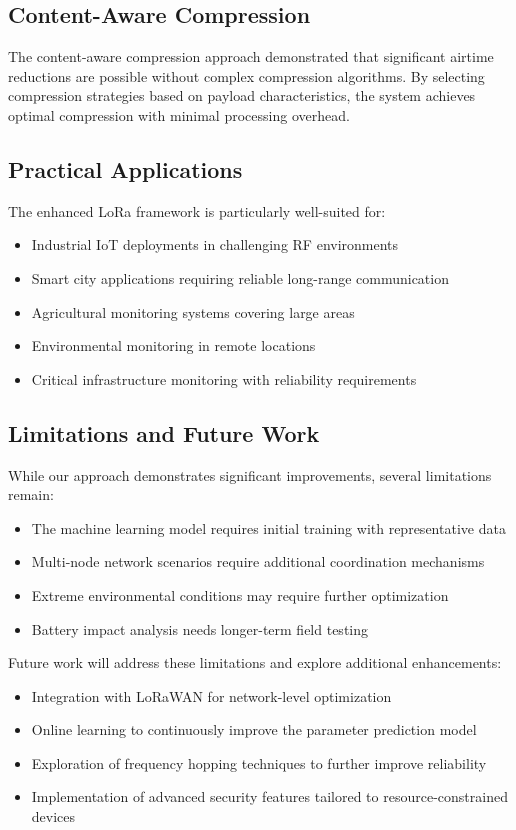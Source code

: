 \documentclass[conference]{IEEEtran}
\begin{document}
\subsection{Content-Aware Compression}
The content-aware compression approach demonstrated that significant airtime reductions are possible without complex compression algorithms. By selecting compression strategies based on payload characteristics, the system achieves optimal compression with minimal processing overhead.

\subsection{Practical Applications}
The enhanced LoRa framework is particularly well-suited for:
\begin{itemize}
    \item Industrial IoT deployments in challenging RF environments
    \item Smart city applications requiring reliable long-range communication
    \item Agricultural monitoring systems covering large areas
    \item Environmental monitoring in remote locations
    \item Critical infrastructure monitoring with reliability requirements
\end{itemize}

\subsection{Limitations and Future Work}
While our approach demonstrates significant improvements, several limitations remain:
\begin{itemize}
    \item The machine learning model requires initial training with representative data
    \item Multi-node network scenarios require additional coordination mechanisms
    \item Extreme environmental conditions may require further optimization
    \item Battery impact analysis needs longer-term field testing
\end{itemize}

Future work will address these limitations and explore additional enhancements:
\begin{itemize}
    \item Integration with LoRaWAN for network-level optimization
    \item Online learning to continuously improve the parameter prediction model
    \item Exploration of frequency hopping techniques to further improve reliability
    \item Implementation of advanced security features tailored to resource-constrained devices
\end{itemize}
\end{document}
